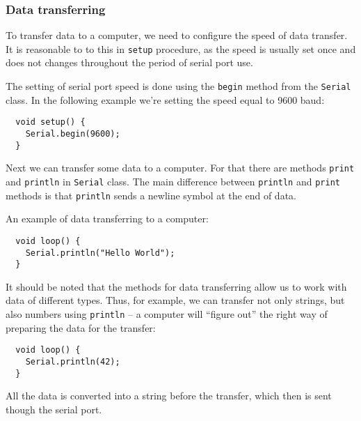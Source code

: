 \documentclass[../sparc.tex]{subfiles}
\begin{document}


\subsubsection{Data transferring}

To transfer data to a computer, we need to configure the speed of data transfer.
It is reasonable to to this in \texttt{setup} procedure, as the speed is usually
set once and does not changes throughout the period of serial port use.

The setting of serial port speed is done using the \texttt{begin} method from
the \texttt{Serial} class.  In the following example we're setting the speed
equal to 9600 baud:

\begin{verbatim}
  void setup() {
    Serial.begin(9600);
  }
\end{verbatim}

Next we can transfer some data to a computer.  For that there are methods
\texttt{print} and \texttt{println} in \texttt{Serial} class.  The main
difference between \texttt{println} and \texttt{print} methods is that
\texttt{println} sends a newline symbol at the end of data.


An example of data transferring to a computer:

\begin{verbatim}
  void loop() {
    Serial.println("Hello World");
  }
\end{verbatim}

It should be noted that the methods for data transferring allow us to work with
data of different types.  Thus, for example, we can transfer not only strings,
but also numbers using \texttt{println} -- a computer will ``figure out'' the
right way of preparing the data for the transfer:

\begin{verbatim}
  void loop() {
    Serial.println(42);
  }
\end{verbatim}

All the data is converted into a string before the transfer, which then is sent
though the serial port.
\end{document}
